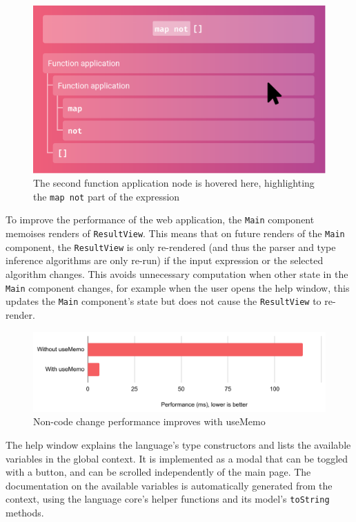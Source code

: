 \documentclass[a4paper,fleqn,oneside,12pt]{report}
\begin{document}
{\centering \begin{figure}[h!]
  \centering
  \includegraphics[width=0.9\linewidth]{images/ast_view_hover.png}
  \caption{The second function application node is hovered here, highlighting the \texttt{map not} part of the expression}
\end{figure} \par}

To improve the performance of the web application, the \texttt{Main} component memoises renders of \texttt{ResultView}. This means that on future renders of the \texttt{Main} component, the \texttt{ResultView} is only re-rendered (and thus the parser and type inference algorithms are only re-run) if the input expression or the selected algorithm changes. This avoids unnecessary computation when other state in the \texttt{Main} component changes, for example when the user opens the help window, this updates the \texttt{Main} component's state but does not cause the \texttt{ResultView} to re-render.

{\centering \begin{figure}[h!]
  \centering
  \includegraphics[width=0.9\linewidth]{images/useMemo_performance.pdf}
  \caption{Non-code change performance improves with useMemo}
\end{figure} \par}

The help window explains the language's type constructors and lists the available variables in the global context. It is implemented as a modal that can be toggled with a button, and can be scrolled independently of the main page. The documentation on the available variables is automatically generated from the context, using the language core's helper functions and its model's \texttt{toString} methods.
\end{document}
